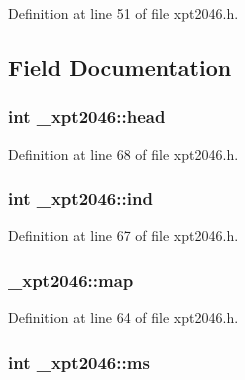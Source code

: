 Definition at line 51 of file xpt2046.\+h.



\subsection{Field Documentation}
\subsubsection[{\texorpdfstring{head}{head}}]{\setlength{\rightskip}{0pt plus 5cm}int \+\_\+xpt2046\+::head}\hypertarget{struct__xpt2046_a8b4e70a2d7a60543902ac8648c986a31}{}\label{struct__xpt2046_a8b4e70a2d7a60543902ac8648c986a31}


Definition at line 68 of file xpt2046.\+h.

\subsubsection[{\texorpdfstring{ind}{ind}}]{\setlength{\rightskip}{0pt plus 5cm}int \+\_\+xpt2046\+::ind}\hypertarget{struct__xpt2046_ae47d989b6ec543113fc386181ea6d98a}{}\label{struct__xpt2046_ae47d989b6ec543113fc386181ea6d98a}


Definition at line 67 of file xpt2046.\+h.

\subsubsection[{\texorpdfstring{map}{map}}]{ \+\_\+xpt2046\+::map}\hypertarget{struct__xpt2046_a851cf6f24189bb94005f00867080a4cd}{}\label{struct__xpt2046_a851cf6f24189bb94005f00867080a4cd}


Definition at line 64 of file xpt2046.\+h.

\subsubsection[{\texorpdfstring{ms}{ms}}]{\setlength{\rightskip}{0pt plus 5cm}int \+\_\+xpt2046\+::ms}\hypertarget{struct__xpt2046_a7ada38c703d34310580fbdb4625a5190}{}\label{struct__xpt2046_a7ada38c703d34310580fbdb4625a5190}



